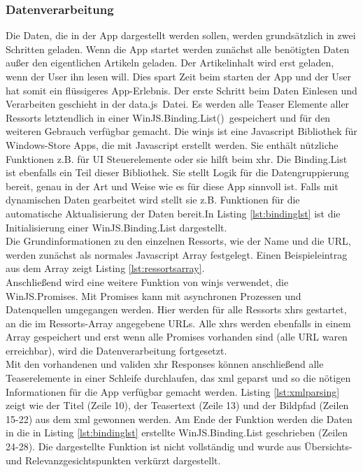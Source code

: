 \documentclass[12pt,a4paper]{scrartcl}
\begin{document}
\subsubsection{Datenverarbeitung}
\label{subsubsec:datenverarbeitung}
Die Daten, die in der App dargestellt werden sollen, werden grundsätzlich in zwei Schritten geladen. Wenn die App startet werden zunächst alle benötigten Daten außer den eigentlichen Artikeln geladen. Der Artikelinhalt wird erst geladen, wenn der User ihn lesen will. Dies spart Zeit beim starten der App und der User hat somit ein flüssigeres App-Erlebnis. Der erste Schritt beim Daten Einlesen und Verarbeiten geschieht in der \glqq data.js\grqq\ Datei. Es werden alle Teaser Elemente aller Ressorts letztendlich in einer \glqq WinJS.Binding.List()\grqq\ gespeichert und für den weiteren Gebrauch verfügbar gemacht. Die \ac{winjs} ist eine Javascript Bibliothek für Windows-Store Apps, die mit Javascript erstellt werden. Sie enthält nützliche Funktionen z.B. für UI Steuerelemente oder sie hilft beim \ac{xhr}. Die Binding.List ist ebenfalls ein Teil dieser Bibliothek. Sie stellt Logik für die Datengruppierung bereit, genau in der Art und Weise wie es für diese App sinnvoll ist. Falls mit dynamischen Daten gearbeitet wird stellt sie z.B. Funktionen für die automatische Aktualisierung der Daten bereit.In Listing \ref{lst:bindinglst} ist die Initialisierung einer WinJS.Binding.List dargestellt.\\

Die Grundinformationen zu den einzelnen Ressorts, wie der Name und die URL, werden zunächst als normales Javascript Array festgelegt. Einen Beispieleintrag aus dem Array zeigt Listing \ref{lst:ressortsarray}.\\



Anschließend wird eine weitere Funktion von \ac{winjs} verwendet, die WinJS.Promises. Mit Promises kann mit asynchronen Prozessen und Datenquellen umgegangen werden. Hier werden für alle Ressorts \ac{xhr}s gestartet, an die im Ressorts-Array angegebene URLs. Alle \ac{xhr}s werden ebenfalls in einem Array gespeichert und erst wenn alle Promises vorhanden sind (alle URL waren erreichbar), wird die Datenverarbeitung fortgesetzt. \\
Mit den vorhandenen und validen \ac{xhr} Responses können anschließend alle Teaserelemente in einer Schleife durchlaufen, das \ac{xml} geparst und so die nötigen Informationen für die App verfügbar gemacht werden. Listing \ref{lst:xmlparsing} zeigt wie der Titel (Zeile 10), der Teasertext (Zeile 13) und der Bildpfad (Zeilen 15-22) aus dem \ac{xml} gewonnen werden. Am Ende der Funktion werden die Daten in die in Listing \ref{lst:bindinglst} erstellte WinJS.Binding.List geschrieben (Zeilen 24-28). Die dargestellte Funktion ist nicht vollständig und wurde aus Übersichts- und Relevanzgesichtspunkten verkürzt dargestellt.\\ 
\end{document}
